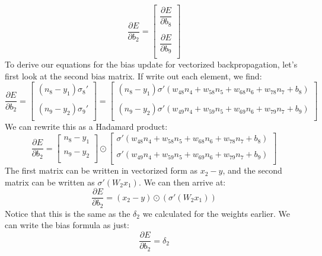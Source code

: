 \documentclass{article}
\begin{document}
\[
\dfrac{\partial E}{\partial b_2} =
\begin{bmatrix}
    \dfrac{\partial E}{\partial b_8} \\ \\
    \dfrac{\partial E}{\partial b_9} \\
\end{bmatrix}
\]
To derive our equations for the bias update for vectorized backpropagation, let's first look at the second bias matrix. If write out each element, we find:
\[
\dfrac{\partial E}{\partial b_2} =
\begin{bmatrix}
    (n_8-y_1)\sigma_8' \\ \\
    (n_9-y_2)\sigma_9' \\
\end{bmatrix}
=
\begin{bmatrix}
    (n_8-y_1)\sigma'(w_{48}n_4 + w_{58}n_5 + w_{68}n_6 + w_{78}n_7 + b_8) \\ \\
    (n_9-y_2)\sigma'(w_{49}n_4 + w_{59}n_5 + w_{69}n_6 + w_{79}n_7 + b_9) \\
\end{bmatrix}
\]
We can rewrite this as a Hadamard product:
\[
\dfrac{\partial E}{\partial b_2} =
\begin{bmatrix}
    n_8-y_1 \\ \\
    n_9-y_2 \\
\end{bmatrix}
\odot
\begin{bmatrix}
    \sigma'(w_{48}n_4 + w_{58}n_5 + w_{68}n_6 + w_{78}n_7 + b_8) \\ \\
    \sigma'(w_{49}n_4 + w_{59}n_5 + w_{69}n_6 + w_{79}n_7 + b_9) \\
\end{bmatrix}
\]
The first matrix can be written in vectorized form as $x_2 - y$, and the second matrix can be written as $\sigma'(W_2x_1)$. We can then arrive at:
\[
\dfrac{\partial E}{\partial b_2} = (x_2 - y) \odot (\sigma'(W_2x_1))
\]
Notice that this is the same as the $\delta_2$ we calculated for the weights earlier. We can write the bias formula as just:
\[\dfrac{\partial E}{\partial b_2} = \delta_2\]
\end{document}
